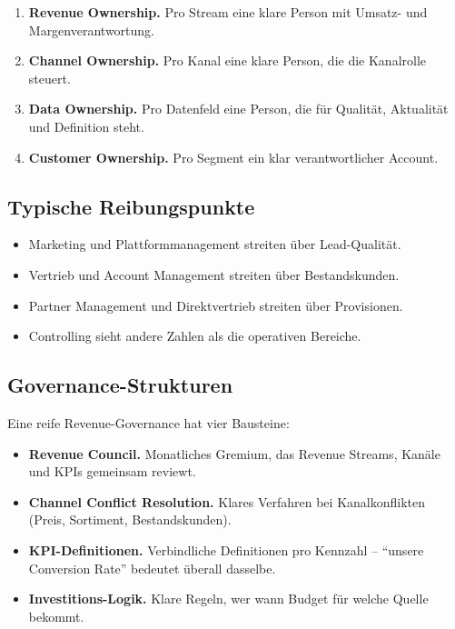 \documentclass[11pt,a4paper,oneside]{article}
\newcommand{\fachbegriff}[1]{\textbf{#1}}
\begin{document}
\begin{enumerate}
  \item \fachbegriff{Revenue Ownership.} Pro Stream eine klare Person mit Umsatz- und Margenverantwortung.
  \item \fachbegriff{Channel Ownership.} Pro Kanal eine klare Person, die die Kanalrolle steuert.
  \item \fachbegriff{Data Ownership.} Pro Datenfeld eine Person, die für Qualität, Aktualität und Definition steht.
  \item \fachbegriff{Customer Ownership.} Pro Segment ein klar verantwortlicher Account.
\end{enumerate}

\subsection{Typische Reibungspunkte}

\begin{itemize}
  \item Marketing und Plattformmanagement streiten über Lead-Qualität.
  \item Vertrieb und Account Management streiten über Bestandskunden.
  \item Partner Management und Direktvertrieb streiten über Provisionen.
  \item Controlling sieht andere Zahlen als die operativen Bereiche.
\end{itemize}

\subsection{Governance-Strukturen}

Eine reife Revenue-Governance hat vier Bausteine:

\begin{itemize}
  \item \textbf{Revenue Council.} Monatliches Gremium, das Revenue Streams, Kanäle und KPIs gemeinsam reviewt.
  \item \textbf{Channel Conflict Resolution.} Klares Verfahren bei Kanalkonflikten (Preis, Sortiment, Bestandskunden).
  \item \textbf{KPI-Definitionen.} Verbindliche Definitionen pro Kennzahl -- ``unsere Conversion Rate'' bedeutet überall dasselbe.
  \item \textbf{Investitions-Logik.} Klare Regeln, wer wann Budget für welche Quelle bekommt.
\end{itemize}
\end{document}
